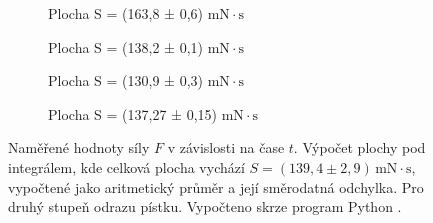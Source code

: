 \begin{figure}[H]
    \vspace{0.5em}
\begin{subfigure}[t]{0.3\textwidth}
            \centering
            
            \caption{
                Plocha S = (163,8 ± 0,6) $\mathrm{mN \cdot s}$
            }
            \label{fig:integrales-2g}
        \end{subfigure}%
    \hfill
\begin{subfigure}[t]{0.3\textwidth}
            \centering
            
            \caption{
                Plocha S = (138,2 ± 0,1) $\mathrm{mN \cdot s}$
            }
            \label{fig:integrales-2h}
        \end{subfigure}%
    \hfill
\begin{subfigure}[t]{0.3\textwidth}
            \centering
            
            \caption{
                Plocha S = (130,9 ± 0,3) $\mathrm{mN \cdot s}$
            }
            \label{fig:integrales-2i}
        \end{subfigure}

    \vspace{0.5em}
\begin{subfigure}[t]{0.3\textwidth}
            \centering
            
            \caption{
                Plocha S = (137,27 ± 0,15) $\mathrm{mN \cdot s}$
            }
            \label{fig:integrales-2j}
        \end{subfigure}

        \caption{
            Naměřené hodnoty síly $F$ v závislosti na čase $t$. Výpočet plochy pod integrálem, kde celková plocha vychází $S=(139,4 \pm 2,9)\,\mathrm{mN\cdot s}$, vypočtené jako aritmetický průměr a její směrodatná odchylka. Pro druhý stupeň odrazu pístku. Vypočteno skrze program Python \cite{GitHubMAT}.
        }
        \label{fig:integrales-2}
    \end{figure}
    
